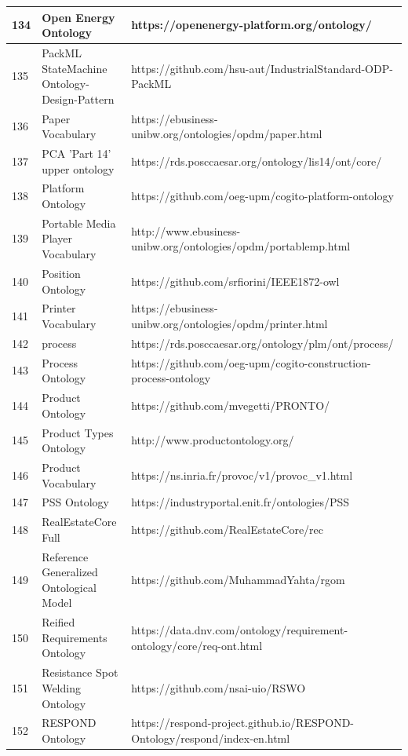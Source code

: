 \documentclass{article}
\begin{document}
\begin{table}[H]
{\begin{tabular}{|l|l|l|}
            134 & Open Energy Ontology & https://openenergy-platform.org/ontology/ \\ \hline
            135 & PackML StateMachine Ontology-Design-Pattern & https://github.com/hsu-aut/IndustrialStandard-ODP-PackML \\ \hline
            136 & Paper Vocabulary & https://ebusiness-unibw.org/ontologies/opdm/paper.html \\ \hline
            137 & PCA 'Part 14' upper ontology & https://rds.posccaesar.org/ontology/lis14/ont/core/ \\ \hline
            138 & Platform Ontology & https://github.com/oeg-upm/cogito-platform-ontology \\ \hline
            139 & Portable Media Player Vocabulary & http://www.ebusiness-unibw.org/ontologies/opdm/portablemp.html \\ \hline
            140 & Position Ontology & https://github.com/srfiorini/IEEE1872-owl \\ \hline
            141 & Printer Vocabulary & https://ebusiness-unibw.org/ontologies/opdm/printer.html \\ \hline
            142 & process & https://rds.posccaesar.org/ontology/plm/ont/process/ \\ \hline
            143 & Process Ontology & https://github.com/oeg-upm/cogito-construction-process-ontology \\ \hline
            144 & Product Ontology & https://github.com/mvegetti/PRONTO/ \\ \hline
            145 & Product Types Ontology & http://www.productontology.org/ \\ \hline
            146 & Product Vocabulary & https://ns.inria.fr/provoc/v1/provoc\_v1.html \\ \hline
            147 & PSS Ontology & https://industryportal.enit.fr/ontologies/PSS \\ \hline
            148 & RealEstateCore Full & https://github.com/RealEstateCore/rec \\ \hline
            149 & Reference Generalized Ontological Model & https://github.com/MuhammadYahta/rgom \\ \hline
            150 & Reified Requirements Ontology & https://data.dnv.com/ontology/requirement-ontology/core/req-ont.html \\ \hline
            151 & Resistance Spot Welding Ontology & https://github.com/nsai-uio/RSWO \\ \hline
            152 & RESPOND Ontology & https://respond-project.github.io/RESPOND-Ontology/respond/index-en.html \\ \hline

\end{tabular}}
\end{table}
\end{document}
